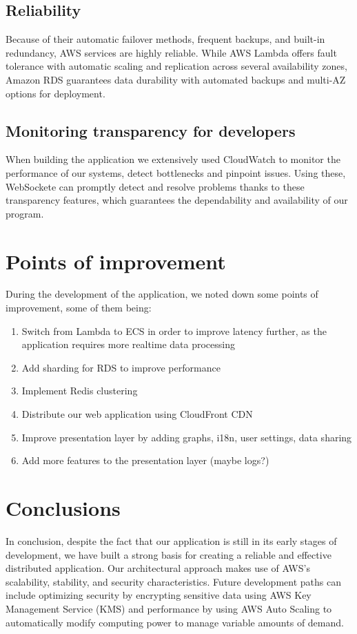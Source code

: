 \documentclass{article}
\begin{document}
\subsection{Reliability}

\hspace{1cm}Because of their automatic failover methods, frequent backups, and built-in redundancy, AWS services are highly reliable. While AWS Lambda offers fault tolerance with automatic scaling and replication across several availability zones, Amazon RDS guarantees data durability with automated backups and multi-AZ options for deployment.

\subsection{Monitoring transparency for developers}

\hspace{1cm}When building the application we extensively used CloudWatch to monitor the performance of our systems, detect
bottlenecks and pinpoint issues. Using these, WebSockete can promptly detect and resolve
problems thanks to these transparency features, which guarantees the dependability and availability of our
program.

\section{Points of improvement}

\hspace{1cm}During the development of the application, we noted down some points of improvement, some of them being:

\begin{enumerate}
    \item Switch from Lambda to ECS in order to improve latency further, as the application requires more realtime data processing
    \item Add sharding for RDS to improve performance
    \item Implement Redis clustering
    \item Distribute our web application using CloudFront CDN
    \item Improve presentation layer by adding graphs, i18n, user settings, data sharing
    \item Add more features to the presentation layer (maybe logs?)
\end{enumerate}

\section{Conclusions}

\hspace{1cm}In conclusion, despite the fact that our application is still in its early stages of development, we have built a strong basis for creating a reliable and effective distributed application. Our architectural approach makes use of AWS's scalability, stability, and security characteristics. Future development paths can include optimizing security by encrypting sensitive data using AWS Key Management Service (KMS) and performance by using AWS Auto Scaling to automatically modify computing power to manage variable amounts of demand.
\end{document}
